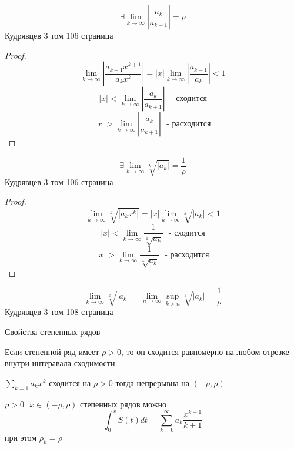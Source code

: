 \begin{theorem}
  $$
  \exists \lim_{k \to \infty} \left| \frac{a_k}{a_{k+1}} \right| = \rho
  $$
  Кудрявцев 3 том 106 страница
\end{theorem}

\begin{proof}
  $$
  \lim_{k \to \infty} \left| \frac{a_{k+1} x^{k+1}}{a_k x^k} \right| =
  |x| \lim_{k \to \infty} \left| \frac{a_{k+1}}{a_k} \right| < 1
  $$
  $$
  |x| < \lim_{k \to \infty} \left| \frac{a_k}{a_{k+1}} \right| ~~~
  \text{- сходится}
  $$
  $$
  |x| > \lim_{k \to \infty} \left| \frac{a_k}{a_{k+1}} \right| ~~~
  \text{- расходится}
  $$
\end{proof}

\begin{theorem}
  $$
  \exists \lim_{k \to \infty} \sqrt[k]{|a_k|} = \frac{1}{\rho}
  $$
  Кудрявцев 3 том 106 страница
\end{theorem}

\begin{proof}
  $$
  \lim_{k \to \infty} \sqrt[k]{|a_k x^k|} = |x| \lim_{k \to \infty}
  \sqrt[k]{|a_k|} < 1
  $$
  $$
  |x| < \lim_{k \to \infty} \frac{1}{\sqrt[k]{a_k}} ~~~ \text{- сходится}
  $$
  $$
  |x| > \lim_{k \to \infty} \frac{1}{\sqrt[k]{a_k}} ~~~ \text{- расходится}
  $$
\end{proof}

\begin{block}
  $$
  \overline{\lim_{k \to \infty}} \sqrt[k]{|a_k|} =
  \lim_{n \to \infty} \sup_{k > n}\sqrt[k]{|a_k|} = \frac{1}{\rho}
  $$
  Кудрявцев 3 том 108 страница
\end{block}

\begin{title}[\Large]
  Свойства степенных рядов
\end{title}

\begin{theorem}
  Если степенной ряд имеет $\rho > 0$, то он сходится равномерно
  на любом отрезке внутри интеравала сходимости.
\end{theorem}

\begin{block}[Следствие 1]
  $\sum_{k=1} a_k x^k$ сходится на $\rho > 0$ тогда непрерывна на
  $(-\rho, \rho)$
\end{block}

\begin{block}[Следствие 2]
  $\rho > 0 ~~~ x \in (-\rho, \rho)$ степенных рядов можно
  $$
  \int_0^x S(t)dt = \sum_{k=0}^{\infty} a_k \frac{x^{k+1}}{k+1}
  $$
  при этом $\rho_k = \rho$
\end{block}

